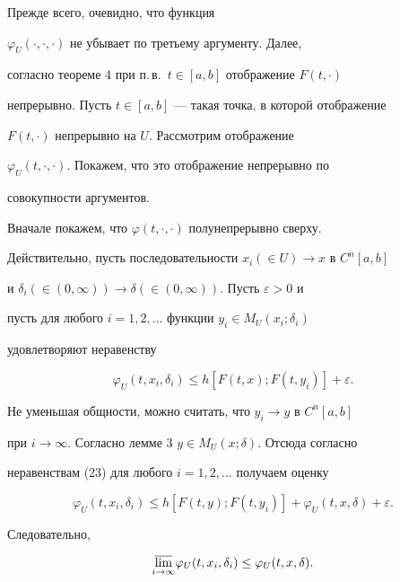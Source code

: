 \begin{pf} Прежде всего, очевидно, что функция


$\varphi_U(\cdot,\cdot,\cdot)$ не убывает по третьему аргументу. Далее,


согласно теореме 4 при п.\,в.~$t\in[a,b]$ отображение $F(t,\cdot)$


непрерывно. Пусть $t\in[a,b]$ --- такая точка, в которой отображение


$F(t,\cdot)$ непрерывно на $U$. Рассмотрим отображение


$\varphi_U(t,\cdot,\cdot)$. Покажем, что это отображение непрерывно по


совокупности аргументов.





Вначале покажем, что $\varphi(t,\cdot,\cdot)$ полунепрерывно сверху.


Действительно, пусть последовательности $x_i(\in U)\to x$ в $C^n[a,b]$


и $\delta_i(\in(0,\infty))\to\delta(\in(0,\infty))$. Пусть $\varepsilon>0$ и


пусть для любого $i=1,2,\dotsc$ функции $y_i\in M_U(x_i;\delta_i)$


удовлетворяют неравенству


\begin{equation}


\varphi_U(t,x_i,\delta_i)\le h[F(t,x);F(t,y_i)]+\varepsilon.


\end{equation}


Не уменьшая общности, можно считать, что $y_i\to y$ в $C^n[a,b]$


при $i\to\infty$. Согласно лемме 3\; $y\in M_U(x;\delta)$. Отсюда согласно


неравенствам (23) для любого $i=1,2,\dotsc$ получаем оценку


$$


\varphi_U(t,x_i,\delta_i)\le h[F(t,y);F(t,y_i)]+\varphi_U(t,x,\delta)


+\varepsilon.


$$


Следовательно,


$$


\underset{i\to\infty}{\varlimsup}{}\varphi_U(t,x_i,\delta_i)\le


\varphi_U(t,x,\delta).


$$






\end{pf}
